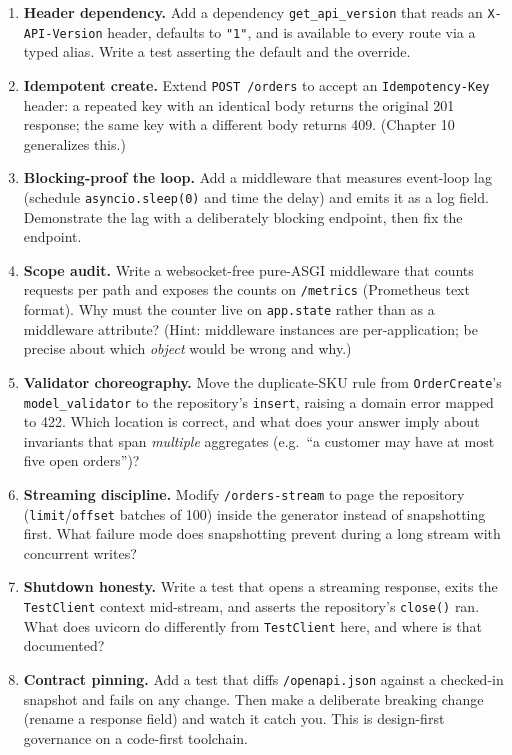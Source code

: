 \begin{enumerate}[label=\textbf{E\arabic*.}, leftmargin=1.2cm, itemsep=0.6em]
  \item \textbf{Header dependency.} Add a dependency
        \texttt{get\_api\_version} that reads an \texttt{X-API-Version}
        header, defaults to \texttt{"1"}, and is available to every route via
        a typed alias. Write a test asserting the default and the override.
  \item \textbf{Idempotent create.} Extend \texttt{POST /orders} to accept an
        \texttt{Idempotency-Key} header: a repeated key with an identical
        body returns the original 201 response; the same key with a different
        body returns 409. (Chapter 10 generalizes this.)
  \item \textbf{Blocking-proof the loop.} Add a middleware that measures
        event-loop lag (schedule \texttt{asyncio.sleep(0)} and time the
        delay) and emits it as a log field. Demonstrate the lag with a
        deliberately blocking endpoint, then fix the endpoint.
  \item \textbf{Scope audit.} Write a websocket-free pure-ASGI middleware
        that counts requests per path and exposes the counts on
        \texttt{/metrics} (Prometheus text format). Why must the counter live
        on \texttt{app.state} rather than as a middleware attribute?
        (Hint: middleware instances are per-application; be precise about
        which \emph{object} would be wrong and why.)
  \item \textbf{Validator choreography.} Move the duplicate-SKU rule from
        \texttt{OrderCreate}'s \texttt{model\_validator} to the repository's
        \texttt{insert}, raising a domain error mapped to 422. Which location
        is correct, and what does your answer imply about invariants that
        span \emph{multiple} aggregates (e.g.\ ``a customer may have at most
        five open orders'')?
  \item \textbf{Streaming discipline.} Modify \texttt{/orders-stream} to page
        the repository (\texttt{limit}/\texttt{offset} batches of 100) inside
        the generator instead of snapshotting first. What failure mode does
        snapshotting prevent during a long stream with concurrent writes?
  \item \textbf{Shutdown honesty.} Write a test that opens a streaming
        response, exits the \texttt{TestClient} context mid-stream, and
        asserts the repository's \texttt{close()} ran. What does uvicorn do
        differently from \texttt{TestClient} here, and where is that
        documented?
  \item \textbf{Contract pinning.} Add a test that diffs
        \texttt{/openapi.json} against a checked-in snapshot and fails on any
        change. Then make a deliberate breaking change (rename a response
        field) and watch it catch you. This is design-first governance on a
        code-first toolchain.
\end{enumerate}

